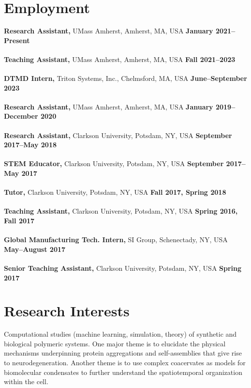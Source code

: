 \documentclass[margin,line]{res}
\begin{document}
\begin{resume}
	\section{\sc Employment}
	 {\bf Research Assistant,} UMass Amherst, Amherst, MA, USA
	\hfill {\bf January 2021--Present}\\
	\\
	{\bf Teaching Assistant,} UMass Amherst, Amherst, MA, USA
	\hfill {\bf Fall 2021--2023}\\
	\\
	{\bf DTMD Intern,} Triton Systems, Inc., Chelmsford, MA, USA
	\hfill {\bf June--September 2023}\\
	\\
	{\bf Research Assistant,} UMass Amherst, Amherst, MA, USA
	\hfill {\bf January 2019--December 2020}\\
	\\
	{\bf Research Assistant,} Clarkson University, Potsdam, NY, USA
	\hfill {\bf September 2017--May 2018}\\
	\\
	{\bf STEM Educator,} Clarkson University, Potsdam, NY, USA
	\hfill {\bf September 2017--May 2017}\\
	\\
	{\bf Tutor,} Clarkson University, Potsdam, NY, USA
	\hfill {\bf Fall 2017, Spring 2018}\\
	\\
	{\bf Teaching Assistant,} Clarkson University, Potsdam, NY, USA
	\hfill {\bf  Spring 2016, Fall 2017}\\
	\\
	{\bf Global Manufacturing Tech. Intern,} SI Group, Schenectady, NY, USA
	\hfill {\bf  May--August 2017}\\
	\\
	{\bf Senior Teaching Assistant,} Clarkson University, Potsdam, NY, USA
	\hfill {\bf Spring 2017}\\

	\vspace{-1em}

	\section{\sc Research Interests}
	Computational studies (machine learning, simulation, theory) of synthetic and
	biological polymeric systems. One major theme is to elucidate the physical
	mechanisms underpinning protein aggregations and self-assemblies that give
	rise to neurodegeneration. Another theme is to use complex coacervates as
	models for biomolecular condensates to further understand the spatiotemporal
	organization within the cell.


\end{resume}
\end{document}
